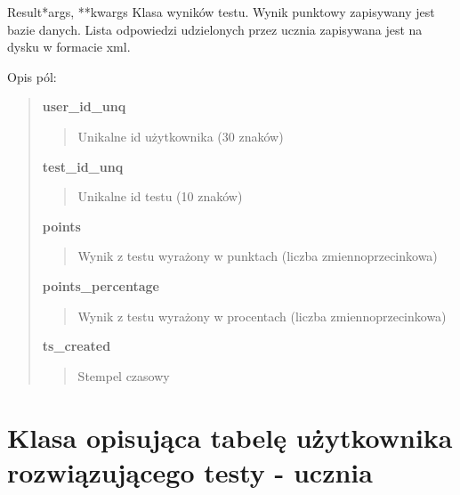 \documentclass[letterpaper,10pt,polish]{manual}
\begin{document}
\hypertarget{knut\_server.tests.models.Result}{}\begin{classdesc}{Result}{*args, **kwargs}
Klasa wyników testu. Wynik punktowy zapisywany jest bazie danych. Lista odpowiedzi udzielonych przez ucznia zapisywana jest na dysku w formacie xml.

Opis pól:
\begin{quote}

\textbf{user\_id\_unq}
\begin{quote}

Unikalne id użytkownika (30 znaków)
\end{quote}

\textbf{test\_id\_unq}
\begin{quote}

Unikalne id testu (10 znaków)
\end{quote}

\textbf{points}
\begin{quote}

Wynik z testu wyrażony w punktach (liczba zmiennoprzecinkowa)
\end{quote}

\textbf{points\_percentage}
\begin{quote}

Wynik z testu wyrażony w procentach (liczba zmiennoprzecinkowa)
\end{quote}

\textbf{ts\_created}
\begin{quote}

Stempel czasowy
\end{quote}
\end{quote}
\end{classdesc}
\hypertarget{models-testuser}{}

\section{Klasa opisująca tabelę użytkownika rozwiązującego testy - ucznia}
\end{document}
